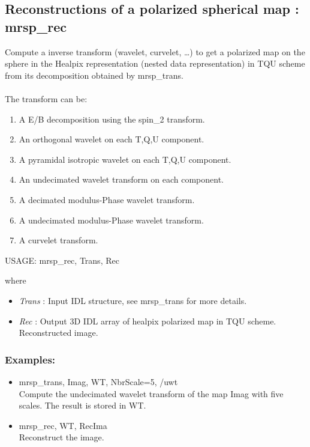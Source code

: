 \subsection{Reconstructions of a polarized spherical map : mrsp\_rec}
Compute a inverse transform (wavelet, curvelet, \ldots) to get a polarized map on the sphere in the Healpix representation 
(nested data representation) in TQU scheme from its decomposition obtained by mrsp\_trans.\\ \\
The transform can be:
\begin{enumerate}
\item A E/B decomposition using the spin\_2 transform.
\item An orthogonal wavelet on each T,Q,U component.
\item A pyramidal isotropic wavelet on each T,Q,U component.
\item An undecimated wavelet transform on each component.
\item A decimated modulus-Phase wavelet transform.
\item A undecimated modulus-Phase wavelet transform.
\item A curvelet transform.
\end{enumerate}
{\bf
\begin{center}
     USAGE: mrsp\_rec, Trans, Rec
\end{center}}
where
\begin{itemize}
\item {\em Trans} : Input IDL structure, see mrsp\_trans for more details.
\item {\em Rec} : Output 3D IDL array of healpix polarized map in TQU scheme. Reconstructed image.
\end{itemize}

\subsubsection*{Examples:} 
\begin{itemize}
\item mrsp\_trans, Imag, WT, NbrScale=5, /uwt \\
Compute the undecimated wavelet transform of the map Imag with five scales. The result is stored in WT.
\item mrsp\_rec, WT, RecIma \\
Reconstruct the image.
\end{itemize}



